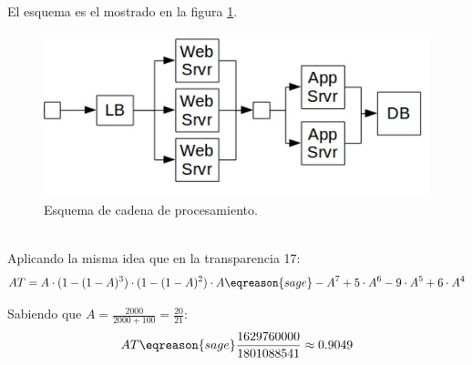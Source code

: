 \begin{problem}[7]
\spart
El esquema es el mostrado en la figura \ref{tema3:prob7:esquema}.
\begin{figure}[hbtp]
	\centering
	\includegraphics[keepaspectratio=true,width=\linewidth]{img/tema3_ej7.png}
	\caption{Esquema de cadena de procesamiento.}
	\label{tema3:prob7:esquema}
\end{figure}
$ $\\
\spart
Aplicando la misma idea que en la transparencia 17:
\[ AT = A \cdot (1 - (1 - A)^3) \cdot (1 - (1 - A)^2) \cdot A \eqreason{sage} -A^7 + 5\cdot A^6 - 9\cdot A^5 + 6\cdot A^4 \]

\spart
Sabiendo que $A = \frac{2000}{2000+100} = \frac{20}{21}$:
\[ AT \eqreason{sage} \frac{1629760000}{1801088541} \approx 0.9049 \]
\end{problem}

